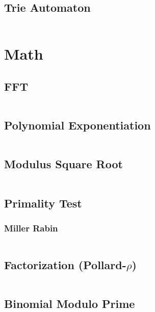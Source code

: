 \documentclass[a4paper, 11pt]{article}   	%
\begin{document}
\inputminted[breaklines, linenos]{cpp}{str/kmp.cpp}

\subsection{Trie Automaton}

\inputminted[breaklines, linenos]{cpp}{str/trieg.cpp}

\section{Math}

\subsection{FFT}

\inputminted[breaklines, linenos]{cpp}{math/fft.cpp}

\subsection{Polynomial Exponentiation}

\inputminted[breaklines, linenos]{cpp}{math/pexp.cpp}

\subsection{Modulus Square Root}

\inputminted[breaklines, linenos]{cpp}{math/msqrt.cpp}

\subsection{Primality Test}

\subsubsection{Miller Rabin}

\inputminted[breaklines, linenos]{cpp}{math/ptest.cpp}

\subsection{Factorization (Pollard-$\rho$)}

\inputminted[breaklines, linenos]{cpp}{math/rho.cpp}

\subsection{Binomial Modulo Prime}
\end{document}

